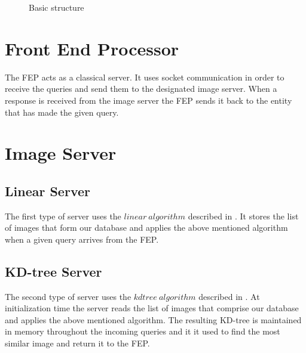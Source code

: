 \begin{figure}[ht!]
\centering

\caption{Basic structure}
\label{fig:basicStructure}
\end{figure}

\section{Front End Processor}

The FEP acts as a classical server. It uses socket communication in order to receive the queries and send them to the designated image server. When a response is received from the image server the FEP sends it back to the entity that has made the given query.

\section{Image Server}

\subsection{Linear Server}
	The first type of server uses the $linear\ algorithm$ described in . It stores the list of images that form our database and applies the above mentioned algorithm when a given query arrives from the FEP.
	
\subsection{KD-tree Server}
	The second type of server uses the $kdtree\ algorithm$ described in . At initialization time the server reads the list of images that comprise our database and applies the above mentioned algorithm. The resulting KD-tree is maintained in memory throughout the incoming queries and it it used to find the most similar image and return it to the FEP.